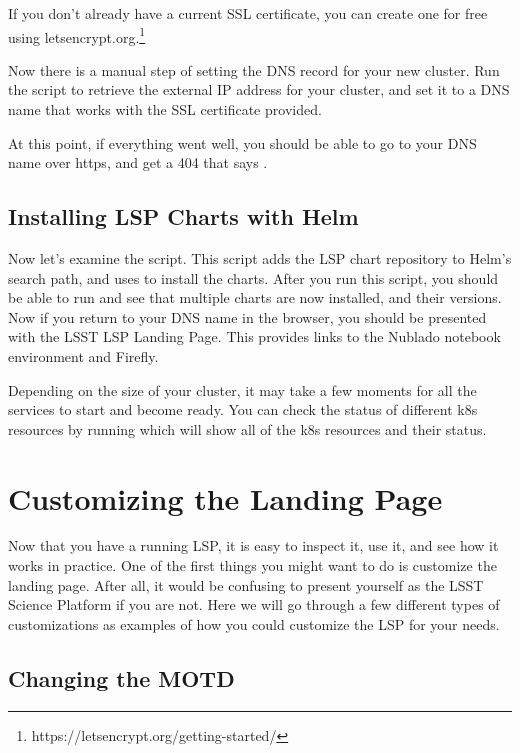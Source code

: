\documentclass[11pt,twoside]{article}
\begin{document}
If you don't already have a current SSL certificate, you can create one for
free using letsencrypt.org.\footnote{https://letsencrypt.org/getting-started/}

Now there is a manual step of setting the DNS record for your new cluster.
Run the  script to retrieve the external IP address for your
cluster, and set it to a DNS name that works with the SSL certificate provided.

At this point, if everything went well, you should be able to go to your
DNS name over https, and get a 404 that says .

\subsection{Installing LSP Charts with Helm}

Now let's examine the  script.  This script adds the LSP
chart repository to Helm's search path, and uses  to install
the charts.  After you run this script, you should be able to run 
and see that multiple charts are now installed, and their versions.  Now if you
return to your DNS name in the browser, you should be presented with the LSST
LSP Landing Page.  This provides links to the Nublado notebook environment and
Firefly.

Depending on the size of your cluster, it may take a few moments for all the
services to start and become ready.  You can check the status of different
k8s resources by running  which will show all of
the k8s resources and their status.

\section{Customizing the Landing Page}

Now that you have a running LSP, it is easy to inspect it, use it, and see
how it works in practice.  One of the first things you might want to do is
customize the landing page.  After all, it would be confusing to present
yourself as the LSST Science Platform if you are not.  Here we will go
through a few different types of customizations as examples of how you
could customize the LSP for your needs.

\subsection{Changing the MOTD}
\end{document}
